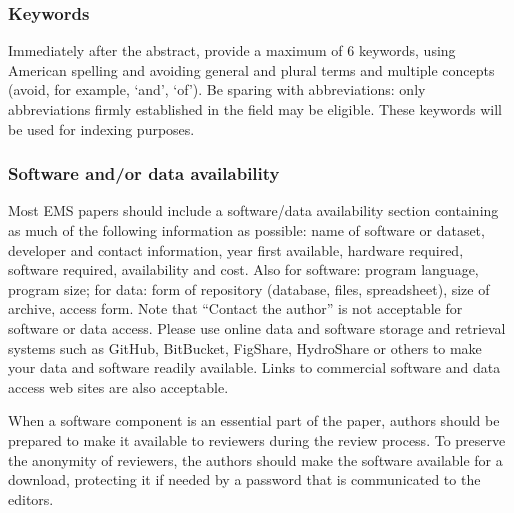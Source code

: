\documentclass[
  number]{elsarticle}
\begin{document}
\hypertarget{keywords}{%
\subsubsection{Keywords}\label{keywords}}

Immediately after the abstract, provide a maximum of 6 keywords, using
American spelling and avoiding general and plural terms and multiple
concepts (avoid, for example, `and', `of'). Be sparing with
abbreviations: only abbreviations firmly established in the field may be
eligible. These keywords will be used for indexing purposes.

\hypertarget{software-andor-data-availability}{%
\subsubsection{Software and/or data
availability}\label{software-andor-data-availability}}

Most EMS papers should include a software/data availability section
containing as much of the following information as possible: name of
software or dataset, developer and contact information, year first
available, hardware required, software required, availability and cost.
Also for software: program language, program size; for data: form of
repository (database, files, spreadsheet), size of archive, access form.
Note that ``Contact the author'' is not acceptable for software or data
access. Please use online data and software storage and retrieval
systems such as GitHub, BitBucket, FigShare, HydroShare or others to
make your data and software readily available. Links to commercial
software and data access web sites are also acceptable.

When a software component is an essential part of the paper, authors
should be prepared to make it available to reviewers during the review
process. To preserve the anonymity of reviewers, the authors should make
the software available for a download, protecting it if needed by a
password that is communicated to the editors.
\end{document}
